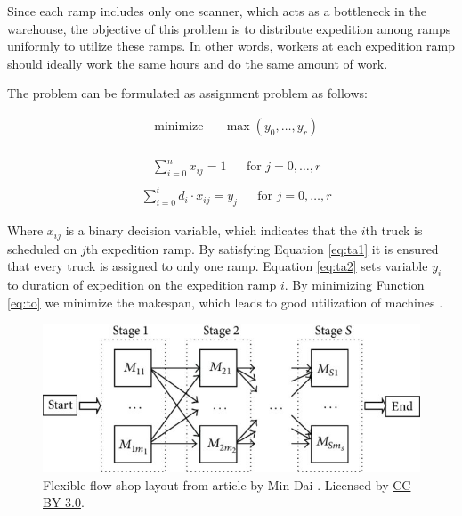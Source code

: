 \documentclass{ctuthesis}
\begin{document}
 Since each ramp includes only one scanner, which acts as a bottleneck in the warehouse, the objective of this problem is to distribute expedition among ramps uniformly to utilize these ramps. In other words, workers at each expedition ramp should ideally work the same hours and do the same amount of work. 
 

  The problem can be formulated as assignment problem as follows:
 
 \begin{equation}\label{eq:to}
\begin{aligned}
&\text{minimize}
&&\max(y_0, \ldots, y_r)
\end{aligned}
\end{equation}
\\
\begin{equation} \label{eq:ta1}
\begin{aligned}
    & \sum_{i=0}^{n} x_{ij} = 1 && \text{for } j=0, \ldots, r\\
\end{aligned}
\end{equation}
\begin{equation} \label{eq:ta2}
\begin{aligned}
    & \sum_{i=0}^{t} {d_i} \cdot x_{ij} = y_j && \text{for } j=0, \ldots, r
\end{aligned}
\end{equation}
  
Where $x_{ij}$ is a binary decision variable, which indicates that the $i$th truck is scheduled on $j$th expedition ramp. By satisfying Equation \ref{eq:ta1} it is ensured that every truck is assigned to only one ramp. Equation \ref{eq:ta2} sets variable $y_i$ to duration of expedition on the expedition ramp $i$. By minimizing Function \ref{eq:to} we minimize the makespan, which leads to good utilization of machines \cite{pinedo}.

\begin{figure}[H]
\includegraphics[width=1\linewidth]{ffll.jpg}
\caption{Flexible flow shop layout from article by Min Dai \cite{ffllsource}. Licensed by \href{https://creativecommons.org/licenses/by/3.0/}{CC BY 3.0}.}
\label{fig:ffll}
\end{figure}
 
\end{document}
